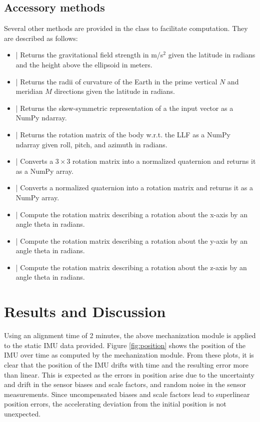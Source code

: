 \documentclass[11pt, oneside]{article}   	%
\begin{document}
\subsection{Accessory methods}
Several other methods are provided in the  class to facilitate computation.  They are described as follows:
\begin{itemize}
	\item {} | Returns the gravitational field strength in m/s$^2$ given the latitude in radians and the height above the ellipsoid in meters.
	\item {} | Returns the radii of curvature of the Earth in the prime vertical $N$ and meridian $M$ directions given the latitude in radians.
	\item {} | Returns the skew-symmetric representation of a the input vector as a NumPy ndarray.
	\item {} | Returns the rotation matrix of the body w.r.t. the LLF as a NumPy ndarray given roll, pitch, and azimuth in radians.
	\item {} | Converts a $3\times3$ rotation matrix into a normalized quaternion and returns it as a NumPy array.
	\item {} | Converts a normalized quaternion into a rotation matrix and returns it as a NumPy array.
	\item {} | Compute the rotation matrix describing a rotation about the x-axis by an angle theta in radians.
	\item {} | Compute the rotation matrix describing a rotation about the y-axis by an angle theta in radians.
	\item {} | Compute the rotation matrix describing a rotation about the z-axis by an angle theta in radians.
\end{itemize}

\section{Results and Discussion}
Using an alignment time of 2 minutes, the above mechanization module is applied to the static IMU data provided. Figure \ref{fig:position} shows the position of the IMU over time as computed by the mechanization module.  From these plots, it is clear that the position of the IMU drifts with time and the resulting error more than linear.  This is expected as the errors in position arise due to the uncertainty and drift in the sensor biases and scale factors, and random noise in the sensor measurements.  Since uncompensated biases and scale factors lead to superlinear position errors, the accelerating deviation from the initial position is not unexpected.
\end{document}
